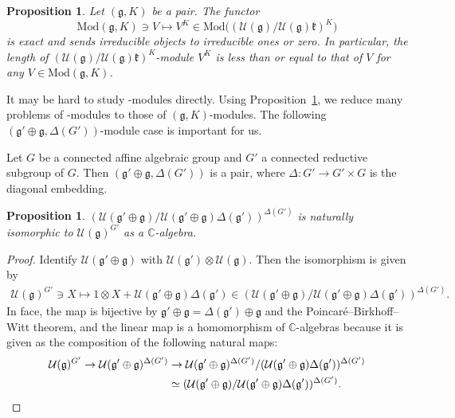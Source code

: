 \documentclass[pdftex]{sigma}
\numberwithin{equation}{section}
\newtheorem{Proposition}[Theorem]{Proposition}
\theoremstyle{definition}
\newcommand{\BasicRing}[1]{\mathbb{#1}}
\newcommand{\CC}{\BasicRing{C}}
\newcommand{\Mod}{\mathrm{Mod}}
\newcommand{\lieC}[1]{\mathfrak{#1}}
\newcommand{\lie}[1]{\mathfrak{#1}}
\newcommand{\univ}[1]{\mathcal{U}(\lieC{#1})}
\begin{document}
\begin{Proposition}\label{prop:UKaction}
	Let $(\lie{g}, K)$ be a pair.
	The functor
 \[
 \Mod(\lie{g}, K) \ni V \mapsto V^K \in \Mod\bigl((\univ{g}/\univ{g}\lie{k})^K\bigr)
 \]
 is exact and
	sends irreducible objects to irreducible ones or zero.
	In particular, the length of $(\univ{g}/\univ{g}\lie{k})^K$-module $V^K$ is less than or equal to that of $V$
	for any $V \in \Mod(\lie{g}, K)$.
\end{Proposition}

It may be hard to study \smash{$(\univ{g}/\univ{g}\lie{k})^K$}-modules directly.
Using Proposition~\ref{prop:UKaction}, we reduce many problems of \smash{$(\univ{g}/\univ{g}\lie{k})^K$}-modules
to those of $(\lie{g}, K)$-modules.
The following $(\lie{g'\oplus g}, \Delta(G'))$-module case is important for us.

Let $G$ be a connected affine algebraic group and $G'$ a connected reductive subgroup of $G$.
Then $(\lie{g' \oplus g}, \Delta(G'))$ is a pair, where $\Delta\colon G'\rightarrow G'\times G$ is the diagonal embedding.

\begin{Proposition}\label{prop:gg'G'}
	$(\univ{g'\oplus g}/\univ{g'\oplus g}\Delta(\lie{g'}))^{\Delta(G')}$
	is naturally isomorphic to $\univ{g}^{G'}$ as a $\CC$-algebra.
\end{Proposition}

\begin{proof}
	Identify $\univ{g'\oplus g}$ with $\univ{g'}\otimes \univ{g}$.
	Then the isomorphism is given by
	\begin{align*}
		\univ{g}^{G'} \ni X \mapsto 1\otimes X + \univ{g'\oplus g}\Delta(\lie{g'}) \in (\univ{g'\oplus g}/\univ{g'\oplus g}\Delta(\lie{g'}))^{\Delta(G')}.
	\end{align*}
	In face, the map is bijective by $\lie{g'}\oplus \lie{g} = \Delta(\lie{g'}) \oplus \lie{g}$ and the Poincar\'e--Birkhoff--Witt theorem,
	and the linear map is a homomorphism of $\CC$-algebras because it is given as the composition of the following natural maps:
	\begin{align*}
		\univ{g}^{G'} \rightarrow \univ{g'\oplus g}^{\Delta(G')} &\rightarrow \univ{g'\oplus g}^{\Delta(G')}/(\univ{g'\oplus g}\Delta(\lie{g'}))^{\Delta(G')} \\
		&\simeq (\univ{g'\oplus g}/\univ{g'\oplus g}\Delta(\lie{g'}))^{\Delta(G')}. \qedhere
 \tag*{\qed}
 \end{align*}
\renewcommand{\qed}{}
\end{proof}
\end{document}
